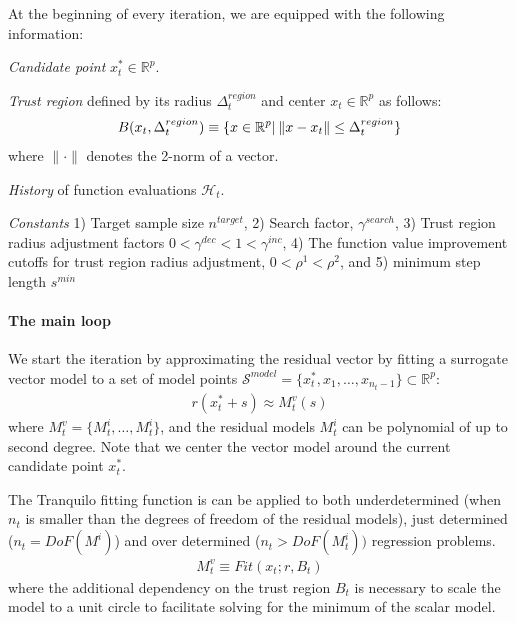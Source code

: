 \begin{algorithm}[H]
{{        }
    }

    \end{algorithm}

\newpage
At the beginning of every iteration, we are equipped with the following information:

\textit{Candidate point} $x_t^*\in\mathbb{R}^p$.

\textit{Trust region} defined by its radius $\Delta_t^{region}$ and center $x_t\in\mathbb{R}^p$ as follows:
\begin{align}
    B(x_t,\Delta_t^{region})\equiv\{x\in\mathbb{R}^p|\hspace{0.2em}\lVert x-x_t\rVert\leq\Delta_t^{region}\}
    \label{eq:def-trustregion}
\end{align}
where $\lVert\cdot\rVert$ denotes the 2-norm of a vector.

\textit{History} of function evaluations $\mathcal{H}_t$.

\textit{Constants} 1) Target sample size $n^{target}$, 2) Search factor, $\gamma^{search}$, 3) Trust region radius adjustment factors $0<\gamma^{dec}<1<\gamma^{inc}$, 4) The function value improvement cutoffs for trust region radius adjustment, $0<\rho^1<\rho^2$, and 5) minimum step length $s^{min}$

\paragraph{The main loop} We start the iteration by approximating the residual vector by fitting a surrogate vector model to a set of model points $\mathcal{S}^{model}=\{x_t^*,x_1,\dots,x_{n_{t}-1}\}\subset\mathbb{R}^p$:
\begin{align}
    r(x_t^*+s)\approx M_t^v(s)
    \label{eq:vec-model}
\end{align}
where $M_t^v = \{M_t^i,\dots,M_t^i\}$, and the residual models $M^i_t$ can be polynomial of up to second degree. Note that we center the vector model around the current candidate point $x_t^*$.

The Tranquilo fitting function is can be applied to both underdetermined (when $n_t$ is smaller than the degrees of freedom of the residual models), just determined ($n_t=DoF(M^i)$) and over determined ($n_t>DoF(M^i_t))$ regression problems.
\begin{align}
    M_t^v\equiv Fit(x_t;r,B_t)
    \label{eq:fit-model}
\end{align}
where the additional dependency on the trust region $B_t$ is necessary to scale the model to a unit circle to facilitate solving for the minimum of the scalar model.

